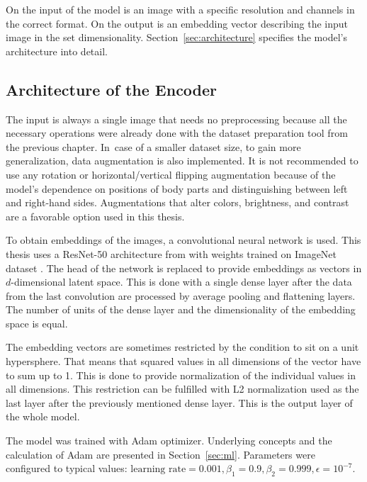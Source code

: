 On the input of the model is an image with a specific resolution and channels in the correct format. On the output is an embedding vector describing the input image in the set dimensionality. Section~\ref{sec:architecture} specifies the model's architecture into detail.

\subsection{\label{sec:architecture}Architecture of the Encoder}

The input is always a single image that needs no preprocessing because all the necessary operations were already done with the dataset preparation tool from the previous chapter. In~case of a smaller dataset size, to gain more generalization, data augmentation is also implemented. It is not recommended to use any rotation or horizontal/vertical flipping augmentation because of the model's dependence on positions of body parts and distinguishing between left and right-hand sides. Augmentations that alter colors, brightness, and contrast are a favorable option used in this thesis.

To obtain embeddings of the images, a convolutional neural network is used. This thesis uses a ResNet-50 architecture from \cite{he2015deep-resnet} with weights trained on ImageNet dataset \cite{imagenet_cvpr09}. The head of the network is replaced to provide embeddings as vectors in $d$-dimensional latent space. This is done with a single dense layer after the data from the last convolution are processed by average pooling and flattening layers. The number of units of the dense layer and the dimensionality of the embedding space is equal.

The embedding vectors are sometimes restricted by the condition to sit on a unit hypersphere. That means that squared values in all dimensions of the vector have to sum up to 1. This is done to provide normalization of the individual values in all dimensions. This restriction can be fulfilled with L2 normalization used as the last layer after the previously mentioned dense layer. This is the output layer of the whole model.

The model was trained with Adam optimizer. Underlying concepts and the calculation of Adam are presented in Section~\ref{sec:ml}. Parameters were configured to typical values: $\text{learning rate} = 0.001, \beta_1 = 0.9, \beta_2 = 0.999, \epsilon = 10^{-7}$.

